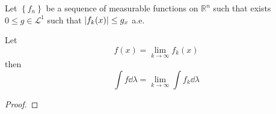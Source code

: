 \begin{theorem}
	Let $\left\{  f_n \right\}$ be a sequence of measurable functions on $\mathbb{R}^n$ such that exists $0\leq g \in \mathcal{L}^1$ such that
	$\abs{f_k(x)} \leq g_x$ a.e.
	
	Let
	$$f(x) = \lim_{k\to \infty} f_k(x)$$
	then
	$$\int f \dd{\lambda} = \lim_{k\to \infty} \int f_k \dd{\lambda}$$
	
	\begin{proof}
		
	\end{proof}
\end{theorem}